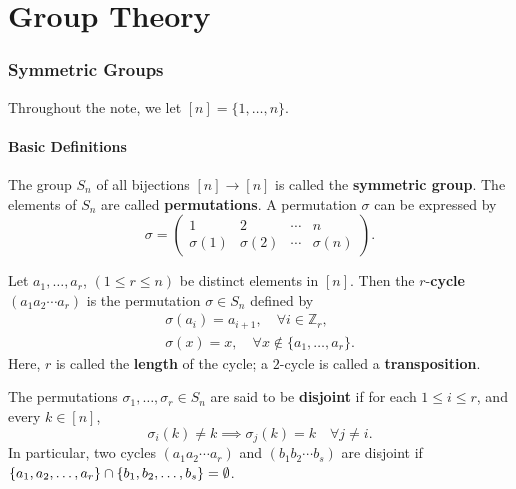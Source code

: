 \part{Group Theory}
\section{Symmetric Groups} \label{sec-symmetric-groups}
Throughout the note, we let $[n] = \{1,\dots, n\}$.
\subsection{Basic Definitions}
\begin{definition}
	The group $S_n$ of all bijections $[n]\rightarrow [n]$ is called the \textbf{symmetric group}. The elements of $S_n$ are called \textbf{permutations}. A permutation $\sigma$ can be expressed by
	\begin{equation*}
		\sigma = \begin{pmatrix}
			1 & 2 & \cdots & n\\
			\sigma(1) &  \sigma(2) & \cdots & \sigma(n)
		\end{pmatrix}.
	\end{equation*}
\end{definition}
\begin{definition}
	Let $a_1,\dots, a_r$, $(1\leq r\leq n)$ be distinct elements in $[n]$. Then the $r$-\textbf{cycle} $(a_1a_2\cdots a_r)$ is the permutation $\sigma\in S_n$ defined by
	\begin{gather*}
		\sigma(a_i) = a_{i+1},\quad \forall i\in\mathbb{Z}_r,
		\\
		\sigma(x) = x,\quad \forall x\not\in\{a_1,\dots, a_r\}.
	\end{gather*} 
	Here, $r$ is called the \textbf{length} of the cycle; a $2$-cycle is called a \textbf{transposition}.
\end{definition}
\begin{definition}
	The permutations $\sigma_1,\dots, \sigma_r\in S_n$ are said to be \textbf{disjoint} if for each $1\leq i\leq r$, and every $k\in[n]$, 
	\begin{equation*}
		\sigma_i(k)\neq k\implies \sigma_j(k)=k\quad \forall j\neq i.
	\end{equation*}
	In particular, two cycles $(a_1a_2\cdots a_r)$ and $(b_1b_2\cdots b_s)$ are disjoint if $\{a_1,a_2,\dots, a_r\}\cap \{b_1,b_2,\break\dots ,b_s\} = \emptyset$.
\end{definition}

